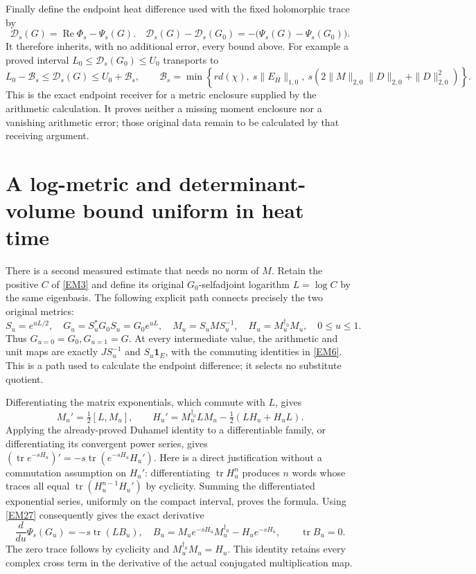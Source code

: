 \documentclass[11pt]{article}
\newcommand{\tr}{\operatorname{tr}}
\newcommand{\adjzero}{\dagger_0}
\newcommand{\Rea}{\operatorname{Re}}
\begin{document}
Finally define the endpoint heat difference used with the fixed
holomorphic trace by
\begin{equation}
 \mathcal D_s(G)=\Rea\Phi_s-\Psi_s(G).
 \quad
 \mathcal D_s(G)-\mathcal D_s(G_0)
     =-\bigl(\Psi_s(G)-\Psi_s(G_0)\bigr).
 \tag{EM25}\label{EM25}
\end{equation}
It therefore inherits, with no additional error, every bound above.
For example a proved interval
\(L_0\le\mathcal D_s(G_0)\le U_0\) transports to
\[
 L_0-\mathcal B_s\le\mathcal D_s(G)\le U_0+\mathcal B_s,
 \qquad
 \mathcal B_s=\min\!\left\{
 r d(\chi),\
 s\|E_H\|_{1,0},\
 s(2\|M\|_{2,0}\|D\|_{2,0}+\|D\|_{2,0}^2)
 \right\}.
\]
This is the exact endpoint receiver for a metric enclosure supplied by
the arithmetic calculation. It proves neither a missing moment enclosure
nor a vanishing arithmetic error; those original data remain to be
calculated by that receiving argument.

\section{A log-metric and determinant-volume bound uniform in heat time}

There is a second measured estimate that needs no norm of \(M\).
Retain the positive \(C\) of \eqref{EM3} and define its original
\(G_0\)-selfadjoint logarithm \(L=\log C\) by the same eigenbasis.
The following explicit path connects precisely the two original metrics:
\begin{equation}
 S_u=e^{uL/2},\quad G_u=S_u^*G_0S_u=G_0e^{uL},\quad
 M_u=S_uMS_u^{-1},\quad H_u=M_u^{\adjzero}M_u,\quad0\le u\le1.
 \tag{EM26}\label{EM26}
\end{equation}
Thus \(G_{u=0}=G_0,G_{u=1}=G\). At every intermediate value, the
arithmetic and unit maps are exactly \(JS_u^{-1}\) and \(S_u\mathbf1_E\),
with the commuting identities in \eqref{EM6}. This is a path used to
calculate the endpoint difference; it selects no substitute quotient.

Differentiating the matrix exponentials, which commute with \(L\), gives
\begin{equation}
 M_u'=\tfrac12[L,M_u],\qquad
 H_u'=M_u^{\adjzero}LM_u-\tfrac12(LH_u+H_uL).
 \tag{EM27}\label{EM27}
\end{equation}
Applying the already-proved Duhamel identity to a differentiable family,
or differentiating its convergent power series, gives
\((\tr e^{-sH_u})'=-s\tr(e^{-sH_u}H_u')\).
Here is a direct justification without a commutation assumption on
\(H_u'\): differentiating \(\tr H_u^n\) produces \(n\) words whose traces
all equal \(\tr(H_u^{n-1}H_u')\) by cyclicity. Summing the differentiated
exponential series, uniformly on the compact interval, proves the formula.
Using \eqref{EM27} consequently gives the exact derivative
\begin{equation}
 \frac{d}{du}\Psi_s(G_u)
  =-s\tr(L B_u),\quad
 B_u=M_u e^{-sH_u}M_u^{\adjzero}-H_u e^{-sH_u},
 \qquad \tr B_u=0.
 \tag{EM28}\label{EM28}
\end{equation}
The zero trace follows by cyclicity and \(M_u^{\adjzero}M_u=H_u\).
This identity retains every complex cross term in the derivative of
the actual conjugated multiplication map.
\end{document}
